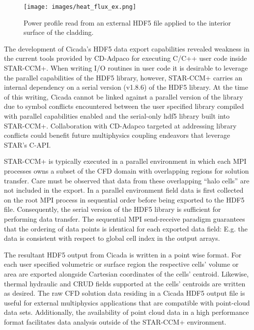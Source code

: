 \begin{figure}[hbtp]
\centering
\texttt{[image: images/heat\_flux\_ex.png]}
\caption{Power profile read from an external HDF5 file applied to the interior surface of the cladding.}
\label{fig:heat_flux_ex}
\end{figure}

The development of Cicada's HDF5 data export capabilities revealed weakness in the current tools provided by CD-Adpaco for executing C/C++ user code inside STAR-CCM+.  When writing I/O routines in user code it is desirable to leverage the parallel capabilities of the HDF5 library, however, STAR-CCM+ carries an internal dependency on a serial version (v1.8.6) of the HDF5 library.  At the time of this writing, Cicada cannot be linked against a parallel version of the library due to symbol conflicts encountered between the user specified library compiled with parallel capabilities enabled and the serial-only hdf5 library built into STAR-CCM+.
Collaboration with CD-Adapco targeted at addressing library conflicts could benefit future multiphysics coupling endeavors that leverage STAR's C-API.

STAR-CCM+ is typically executed in a parallel environment in which each MPI processes owns a subset of the CFD domain with overlapping regions for solution transfer.  Care must be observed that data from these overlapping ``halo cells'' are not included in the export.  In a parallel environment field data is first collected on the root MPI process in sequential order before being exported to the HDF5 file.  Consequently, the serial version of the HDF5 library is sufficient for performing data transfer.  The sequential MPI send-receive paradigm guarantees that the ordering of data points is identical for each exported data field: E.g. the data is consistent with respect to global cell index in the output arrays.   

The resultant HDF5 output from Cicada is written in a point wise format.  For each user specified volumetric or surface region the respective cells' volume or area are exported alongside Cartesian coordinates of the cells' centroid.  Likewise, thermal hydraulic and CRUD fields supported at the cells' centroids are written as desired.  The raw CFD solution data residing in a Cicada HDF5 output file is useful for external multiphysics applications that are compatible with point-cloud data sets.  Additionally, the availability of point cloud data in a high performance format facilitates data analysis outside of the STAR-CCM+ environment.  

